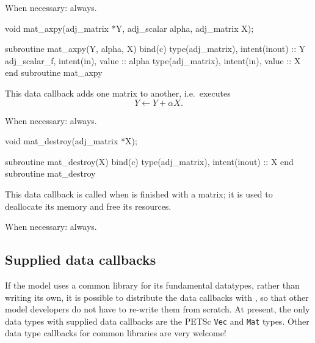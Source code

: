 When necessary: always.
\begin{framed}
\begin{minipage}{\columnwidth}
\begin{ccode}
  void mat_axpy(adj_matrix *Y, adj_scalar alpha, adj_matrix X);
\end{ccode}
\begin{fortrancode}
  subroutine mat_axpy(Y, alpha, X) bind(c)
    type(adj_matrix), intent(inout) :: Y
    adj_scalar_f, intent(in), value :: alpha
    type(adj_matrix), intent(in), value :: X
  end subroutine mat_axpy
\end{fortrancode}
\end{minipage}
\end{framed}
This data callback adds one matrix to another, i.e.\ executes
\begin{equation*}
Y \leftarrow Y + \alpha X.
\end{equation*}

When necessary: always.
\begin{framed}
\begin{minipage}{\columnwidth}
\begin{ccode}
  void mat_destroy(adj_matrix *X);
\end{ccode}
\begin{fortrancode}
  subroutine mat_destroy(X) bind(c)
    type(adj_matrix), intent(inout) :: X
  end subroutine mat_destroy
\end{fortrancode}
\end{minipage}
\end{framed}
This data callback is called when \libadjoint is finished
with a matrix; it is used to deallocate its memory and free
its resources.

When necessary: always.
\subsection{Supplied data callbacks}
If the model uses a common library for its fundamental datatypes, rather than
writing its own, it is possible to distribute the data callbacks with \libadjoint,
so that other model developers do not have to re-write them from scratch. At present, the
only data types with supplied data callbacks are the PETSc \texttt{Vec} and \texttt{Mat} types.
Other data type callbacks for common libraries are very welcome!


